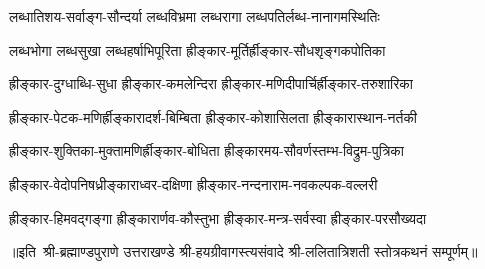 \twolineshloka
{लब्धातिशय-सर्वाङ्ग-सौन्दर्या लब्धविभ्रमा}
{लब्धरागा लब्धपतिर्लब्ध-नानागमस्थितिः}

\twolineshloka
{लब्धभोगा लब्धसुखा लब्धहर्षाभिपूरिता}
{ह्रीङ्कार-मूर्तिर्ह्रीङ्कार-सौधशृङ्गकपोतिका}

\twolineshloka
{ह्रीङ्कार-दुग्धाब्धि-सुधा ह्रीङ्कार-कमलेन्दिरा}
{ह्रीङ्कार-मणिदीपार्चिर्ह्रीङ्कार-तरुशारिका}

\twolineshloka
{ह्रीङ्कार-पेटक-मणिर्ह्रीङ्कारादर्श-बिम्बिता}
{ह्रीङ्कार-कोशासिलता ह्रीङ्कारास्थान-नर्तकी}

\twolineshloka
{ह्रीङ्कार-शुक्तिका-मुक्तामणिर्ह्रीङ्कार-बोधिता}
{ह्रीङ्कारमय-सौवर्णस्तम्भ-विद्रुम-पुत्रिका}

\twolineshloka
{ह्रीङ्कार-वेदोपनिषध्रीङ्काराध्वर-दक्षिणा}
{ह्रीङ्कार-नन्दनाराम-नवकल्पक-वल्लरी}

\twolineshloka
{ह्रीङ्कार-हिमवद्गङ्गा ह्रीङ्कारार्णव-कौस्तुभा}
{ह्रीङ्कार-मन्त्र-सर्वस्वा ह्रीङ्कार-परसौख्यदा}

॥इति~श्री-ब्रह्माण्डपुराणे उत्तराखण्डे श्री-हयग्रीवागस्त्यसंवादे 
श्री-ललितात्रिशती स्तोत्रकथनं सम्पूर्णम्॥
